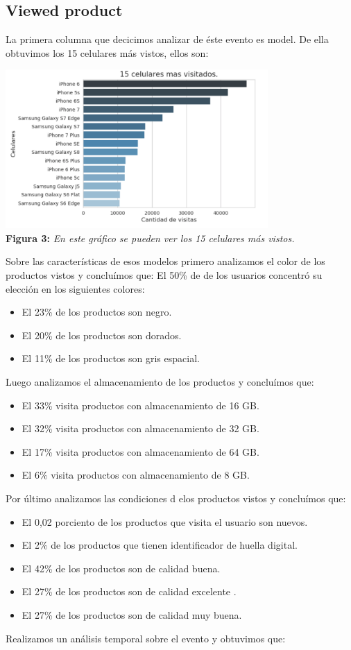 \documentclass[titlepage,a4paper]{article}
\begin{document}
	\subsection{Viewed product}
	La primera columna que decicimos analizar de éste evento es model. De ella obtuvimos los 15 celulares más vistos, ellos son:
	\begin{center}
	\includegraphics[width=10cm]{15celularesMasVisitados.jpg}\\
	\textbf{Figura 3:}  \textit{En este gráfico se pueden ver los 15 celulares más vistos.  }
	\end{center}
	 Sobre las características de esos modelos primero analizamos el color de los productos vistos y concluímos que: 
	 El 50\% de de los usuarios concentró su elección en los siguientes colores:
	 \begin{itemize}
	 \item El 23\% de los productos son negro.
	\item El 20\% de los productos son dorados.
	\item El 11\% de los productos son gris espacial.
	\end{itemize}	  
	Luego analizamos el almacenamiento de los productos y concluímos que:
	\begin{itemize}
	\item El 33\% visita productos con almacenamiento de 16 GB.
    \item El 32\% visita productos con almacenamiento de 32 GB.
    \item El 17\% visita productos con almacenamiento de 64 GB.
    \item El 6\% visita productos con almacenamiento de 8 GB.
	\end{itemize}
	Por último analizamos las condiciones d elos productos vistos y concluímos que:
	\begin{itemize}
	\item El 0,02 porciento de los productos que visita el usuario son nuevos.    
    \item El 2\% de los productos que tienen identificador de huella digital. 
    \item El 42\% de los productos son de calidad buena.
    \item El 27\% de los productos son de calidad excelente .
    \item El 27\% de los productos son de calidad muy buena.
	\end{itemize}
	Realizamos un análisis temporal sobre el evento y obtuvimos que:
	
\end{document}
